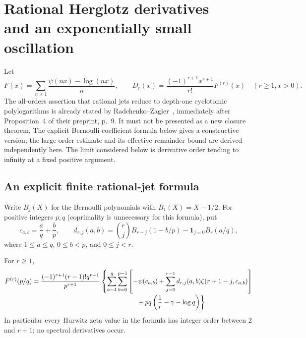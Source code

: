 \section[Rational Herglotz derivatives and an exponentially small oscillation]{Rational Herglotz derivatives\\and an exponentially small oscillation}
\label{hergjet:sec:herglotz}

Let
\[
 F(x)=\sum_{n\ge1}\frac{\psi(nx)-\log(nx)}n,\qquad
 D_r(x)=\frac{(-1)^{r+1}x^{r+1}}{r!}F^{(r)}(x)
 \quad(r\ge1, x>0).
\]
The all-orders assertion that rational jets reduce to depth-one cyclotomic
polylogarithms is already stated by Radchenko--Zagier~\cite{RadchenkoZagier}, immediately after
Proposition~4 of their preprint, p.~9. It must not be presented as a new
closure theorem. The explicit Bernoulli coefficient formula below gives a
constructive version; the large-order estimate and its effective remainder
bound are derived independently here. The limit considered below is derivative order tending to infinity at a fixed positive argument.

\subsection{An explicit finite rational-jet formula}

Write $B_j(X)$ for the Bernoulli polynomials with $B_1(X)=X-1/2$.
For positive integers $p,q$ (coprimality is unnecessary for this formula), put
\[
 c_{a,b}=\frac aq+\frac bp,\qquad
 d_{r,j}(a,b)=\binom rj B_{r-j}(1-b/p)
              -\mathbf1_{j=0}B_r(a/q),
\]
where $1\le a\le q$, $0\le b<p$, and $0\le j<r$.

\begin{theorem}\label{hergjet:thm:rational-jets}
For $r\ge1$,
\begin{align*}
F^{(r)}(p/q)
={}&\frac{(-1)^{r+1}(r-1)!q^{r-1}}{p^{r+1}}
\left\{
\sum_{a=1}^{q}\sum_{b=0}^{p-1}
\left[-\psi(c_{a,b})+
 \sum_{j=0}^{r-1}d_{r,j}(a,b)\zeta(r+1-j,c_{a,b})\right]
\right.\\[-2pt]
&\hspace{50mm}\left.{}+pq\left(\frac1r-\gamma-\log q\right)
\right\}.
\end{align*}
In particular every Hurwitz zeta value in the formula has integer order
between $2$ and $r+1$; no spectral derivatives occur.
\end{theorem}

